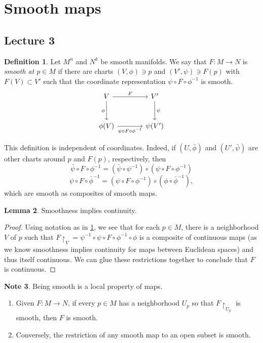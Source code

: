 \documentclass[10pt,letterpaper,cm]{nupset}
\theoremstyle{definition}
\newtheorem{definition}{Definition}[subsection]
\newtheorem{note}[definition]{Note}
\theoremstyle{theorem}
\newtheorem{lemma}[definition]{Lemma}
\theoremstyle{remark}
\newcommand{\1}{\mathbf{1}}
\newcommand{\0}{\vec 0}
\begin{document}
\section{Smooth maps}

\subsection{Lecture 3}

\begin{definition}\label{smap}
Let $M^n$ and $N^k$ be smooth manifolds. We say that $F: M \to N$ is \textit{smooth at $p \in M$} if there are charts $(V, \phi) \ni p$ and $(V', \psi) \ni F(p)$ with $F(V) \subset V'$ such that the coordinate representation $\psi \circ F \circ \phi^{-1}$ is smooth.
\[
\begin{tikzcd}[row sep=large, column sep = large]
V \arrow[r, "F"] \arrow[d, "\phi", swap]
& V' \arrow[d, "\psi"] \\
\phi(V) \arrow[r, "\psi \circ F \circ \phi^{-1}"']
& \psi(V')
\end{tikzcd}
\]
\end{definition}

This definition is independent of coordinates. Indeed, if $(U, \bar{\phi})$ and $(U', \bar{\psi})$ are other charts around $p$ and $F(p)$, respectively, then $$\bar{\psi} \circ F \circ \phi^{-1} = (\bar{\psi} \circ \psi^{-1}) \circ (\psi \circ F \circ \phi^{-1})$$ $$\psi \circ F\circ \bar{\phi}^{-1} = (\psi \circ F \circ \phi^{-1}) \circ (\phi \circ \bar{\phi}^{-1}),$$ which are smooth as composites of smooth maps.

\begin{lemma}\label{sco}
Smoothness implies continuity.
\end{lemma}
\begin{proof}
Using notation as in \cref{smap}, we see that for each $p\in M$, there is a neighborhood $V$ of $p$ such that $F\restriction_V =  \psi^{-1} \circ \psi \circ F \circ \phi^{-1} \circ \phi$ is a composite of continuous maps (as we know smoothness implies continuity for maps between Euclidean spaces) and thus itself continuous. We can glue these restrictions together to conclude that $F$ is continuous. 
\end{proof}


\begin{note} Being smooth is a local property of maps.
\begin{enumerate}
\item Given $F:M\to N$, if every $p\in M$ has a neighborhood $U_p$ so that $F\restriction_{U_p}$ is smooth, then $F$ is smooth.
\item Conversely, the restriction of any smooth map to an open subset is smooth. 
\end{enumerate}
\end{note}
\end{document}

